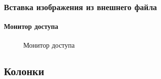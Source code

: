 \begin{frame}
    \frametitle{Вставка изображения из внешнего файла}
    \framesubtitle{Монитор доступа}
    
    \begin{figure}
        \begin{center}
            
            \caption{Монитор доступа}
            \label{pict:AccessControl}
        \end{center}
    \end{figure} 
\end{frame}


\subsection{Колонки}

